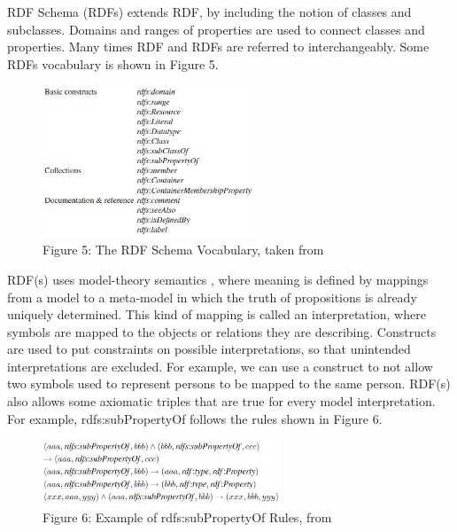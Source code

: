 \documentclass[10pt,journal,compsoc]{IEEEtran}
\begin{document}
RDF Schema (RDFs) extends RDF, by including the notion of classes and subclasses.  Domains and ranges of properties are used to connect classes and properties.  Many times RDF and RDFs are referred to interchangeably.  Some RDFs vocabulary is shown in Figure 5.

\begin{figure}[htbp] %
   \centering
   \includegraphics[width=2.5in]{RDFSchemaVocabPic.jpg} 
  \caption*{Figure 5: The RDF Schema Vocabulary, taken from \cite{_social_2007}}
   \label{}
\label{}   
\end{figure}



RDF(s) uses model-theory semantics , where meaning is defined by mappings from a model to a meta-model in which the truth of propositions is already uniquely determined.  This kind of mapping is called an interpretation, where symbols are mapped to the objects or relations they are describing. Constructs are used to put constraints on possible interpretations, so that unintended interpretations are excluded.  For example, we can use a construct to not allow two symbols used to represent persons to be mapped to the same person.
RDF(s) also allows some axiomatic triples that are true for every model interpretation.  For example, rdfs:subPropertyOf follows the rules shown in Figure 6.

\begin{figure}[htbp] %
   \centering
   \includegraphics[width=2.8in]{subPropertyOfRules.jpg} 
  \caption*{Figure 6: Example of rdfs:subPropertyOf Rules, from \cite{_social_2007}}
   \label{}
\label{}   
\end{figure}
\end{document}
